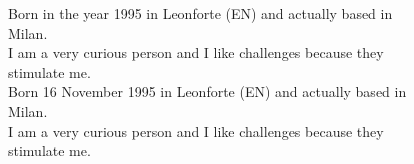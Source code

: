\documentclass[9pt]{developercv} %
\begin{document}
\vspace{0.5cm}



\begin{figure}[!htb]
    \centering
    \begin{minipage}{0.5\textwidth} %
    \vspace{0.3cm}
	\vspace{-\baselineskip} %
	
	Born in the year 1995 in Leonforte (EN) and actually based in Milan.\\
	I am a very curious person and I like challenges because they stimulate me.\\
	

		Born 16 November 1995 in Leonforte (EN) and actually based in Milan.\\
		I am a very curious person and I like challenges because they stimulate me.\\


	\end{minipage}
	\hfill %
	\begin{minipage}{0.4\textwidth} %
		\centering
	\end{minipage}
\end{figure}

\vspace{0.5cm}

\end{document}
